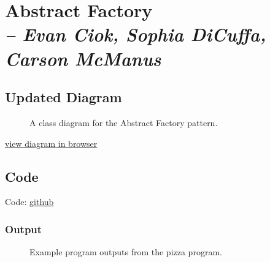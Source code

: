 \chapter{Abstract Factory \\
  \small{\textit{-- Evan Ciok, Sophia DiCuffa, Carson McManus}}
  \label{Chapter::AbstractFactory}}

\section{Updated Diagram}

\begin{figure}[htb]
  \centering
  \caption{\label{Figure::pizzadiagram} A class diagram for the Abstract Factory pattern.}
\end{figure}

\href{https://github.com/dyc3/ssw345-group-assignments/blob/main/Figures/abstractFactory/figures-source.md}{view diagram in browser}

\section{Code}

Code: \href{https://github.com/dyc3/ssw345-group-assignments}{github}

\subsection{Output}

\begin{figure}[htb]
  \centering
  \caption{\label{Figure::pizzaoutput} Example program outputs from the pizza program.}
\end{figure}